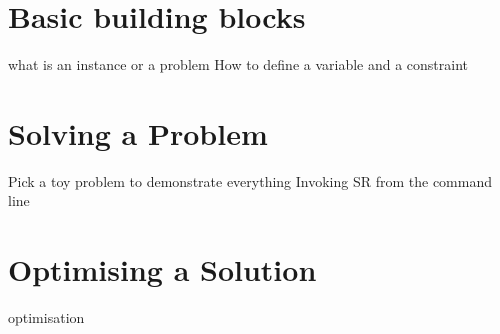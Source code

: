 \section{Basic building blocks}
 what is an instance or a problem
How to define a variable and a constraint

\section{Solving a Problem}
Pick a toy problem to demonstrate everything
Invoking SR from the command line

\section{Optimising a Solution}
optimisation



